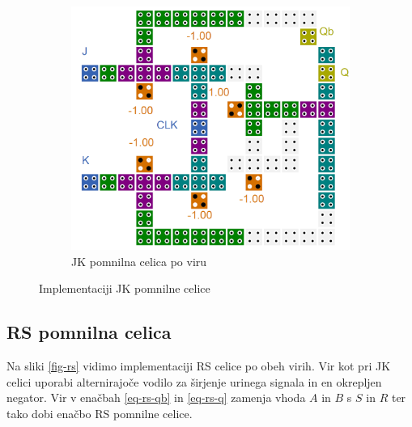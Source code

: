 \documentclass[a4paper, 11pt]{article}
\begin{document}
\begin{figure}[h!]
\begin{subfigure}[b]{0.4\textwidth}
	\includegraphics[width=\textwidth]{../img/vir_5/jk.png} 
	\caption{JK pomnilna celica po viru \cite{a_novel_approach}}
	\label{fig-jk-2}
	\end{subfigure}
	\caption{Implementaciji JK pomnilne celice}
	\label{fig-jk}
\end{figure}

\subsection{RS pomnilna celica}
Na sliki \ref{fig-rs} vidimo implementaciji RS celice po obeh virih. Vir \cite{quantum_dot} kot pri JK celici uporabi alternirajoče vodilo za širjenje urinega signala in en okrepljen negator. Vir \cite{a_novel_approach} v enačbah \ref{eq-rs-qb} in \ref{eq-rs-q} zamenja vhoda $A$ in $B$ s $S$ in $R$ ter tako dobi enačbo RS pomnilne celice.
\end{document}

